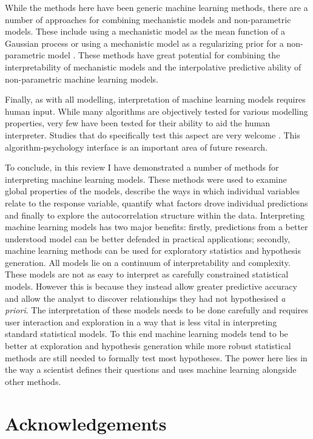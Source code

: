 \documentclass[12pt]{article}
\begin{document}
While the methods here have been generic machine learning methods, there are a number of approaches for combining mechanistic models and non-parametric models.
These include using a mechanistic model as the mean function of a Gaussian process \citep{rasmussen2004gaussian} or using a mechanistic model as a regularizing prior for a non-parametric model \citep{lyddon2018nonparametric}.
These methods have great potential for combining the interpretability of mechanistic models and the interpolative predictive ability of non-parametric machine learning models.

Finally, as with all modelling, interpretation of machine learning models requires human input.
While many algorithms are objectively tested for various modelling properties, very few have been tested for their ability to aid the human interpreter.
Studies that do specifically test this aspect are very welcome \citep{bastani2017interpreting}.
This algorithm-psychology interface is an important area of future research.

To conclude, in this review I have demonstrated  a number of methods for interpreting machine learning models.
These methods were used to examine global properties of the models, describe the ways in which individual variables relate to the response variable, quantify what factors drove individual predictions and finally to explore the autocorrelation structure within the data.
Interpreting machine learning models has two major benefits: firstly, predictions from a better understood model can be better defended in practical applications; secondly, machine learning methods can be used for exploratory statistics and hypothesis generation.
All models lie on a continuum of interpretability and complexity.
These models are not as easy to interpret as carefully constrained statistical models.
However this is because they instead allow greater predictive accuracy and allow the analyst to discover relationships they had not hypothesised \emph{a priori}.
The interpretation of these models needs to be done carefully and requires user interaction and exploration in a way that is less vital in interpreting standard statistical models.
To this end machine learning models tend to be better at exploration and hypothesis generation while more robust statistical methods are still needed to formally test most hypotheses.
The power here lies in the way a scientist defines their questions and uses machine learning alongside other methods.

 
\section{Acknowledgements}
\end{document}
